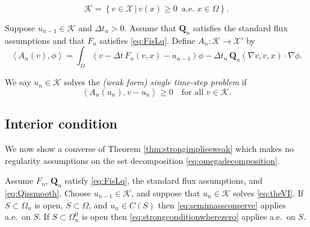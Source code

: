 \documentclass[final,onefignum]{siamart190516}
\newcommand\bQ{\mathbf{Q}}
\newcommand{\grad}{\nabla}
\newcommand{\ip}[2]{\ensuremath{\left<#1,#2\right>}}
\begin{document}
\begin{definition}
\begin{equation}
\mathcal{K} = \left\{v \in \mathcal{X} \,\big|\, v(x) \ge 0\, \text{ a.e.~} x \in \Omega\right\}.  \label{eq:defineK}
\end{equation}
\end{definition}

\begin{definition}  Suppose $u_{n-1}\in\mathcal{K}$ and $\Delta t_n>0$.  Assume that $\bQ_n$ satisfies the standard flux assumptions and that $F_n$ satisfies \eqref{eq:FisLq}.  Define $A_n:\mathcal{K} \to \mathcal{X}'$ by
\begin{equation}
  \ip{A_n(v)}{\phi} = \int_\Omega \left(v - \Delta t\, F_n(v,x) - u_{n-1}\right)\phi - \Delta t_n\, \bQ_n(\grad v,v,x) \cdot \grad\phi. \label{eq:defineAn}
\end{equation}
\end{definition}

\begin{definition}  We say $u_n\in\mathcal{K}$ solves the \emph{(weak form) single time-step problem} if
\begin{equation}
  \ip{A_n(u_n)}{v-u_n} \ge 0 \quad \text{for all } v \in \mathcal{K}.  \label{eq:theVI}
\end{equation}
\end{definition}

\subsection{Interior condition}  \label{subsec:interior}  We now show a converse of Theorem \ref{thm:strongimpliesweak} which makes no regularity assumptions on the set decomposition \eqref{eq:omegadecomposition}.

\begin{theorem} \label{thm:weakimpliesstrong}  Assume $F_n$, $\bQ_n$ satisfy \eqref{eq:FisLq}, the standard flux assumptions, and \eqref{eq:Qissmooth}.  Choose $u_{n-1}\in\mathcal{K}$, and suppose that $u_n\in\mathcal{K}$ solves \eqref{eq:theVI}.  If $S \subset \Omega_n$ is open, $\overline{S}\subset \Omega$, and $u_n\in C(S)$ then \eqref{eq:semimassconserve} applies a.e.~on $S$.  If $S \subset \Omega_n^0$ is open then \eqref{eq:strongconditionwherezero} applies a.e.~on $S$.
\end{theorem}
\end{document}
